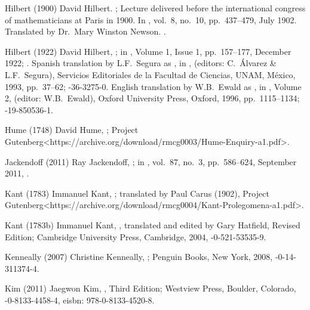 \biblabel Hilbert (1900)
David Hilbert.
;
Lecture delivered before the international
congress of mathematicians at Paris in 1900.
In ,
vol.\ 8, no.\ 10, pp.\ 437--479, July 1902.
Translated by Dr.\ Mary Winston Newson.
.

\biblabel Hilbert (1922)
David Hilbert,
;
in ,
Volume 1, Issue 1, pp.~157--177, December 1922;
.
Spanish translation by L.F.\ Segura as
,
in ,
 (editors: C.\ Álvarez \& L.F.\ Segura),
Servicios Editoriales de la Facultad de Ciencias, UNAM,
México, 1993, pp.~37--62;
-36-3275-0.
English translation by W.B.\ Ewald as
,
in , Volume 2,
 (editor: W.B.\ Ewald),
Oxford University Press, Oxford, 1996, pp.~1115--1134;
-19-850536-1.

\biblabel Hume (1748)
David Hume,
;
\URL Project Gutenberg<https://archive.org/download/rmcg0003/Hume-Enquiry-a1.pdf>.

\biblabel Jackendoff (2011)
Ray Jackendoff,
;
in ,
vol.\ 87, no.\ 3, pp.\ 586--624, September 2011,
.

\biblabel Kant (1783)
Immanuel Kant,
;
translated by Paul Carus (1902),
\URL Project Gutenberg<https://archive.org/download/rmcg0004/Kant-Prolegomena-a1.pdf>.

\biblabel Kant (1783b)
Immanuel Kant,
,
translated and edited by Gary Hatfield, Revised Edition;
Cambridge University Press, Cambridge, 2004,
-0-521-53535-9.

\biblabel Kenneally (2007)
Christine Kenneally,
;
Penguin Books, New York, 2008,
-0-14-311374-4.

\biblabel Kim (2011)
Jaegwon Kim,
, Third Edition;
Westview Press, Boulder, Colorado,
-0-8133-4458-4,
e{\sc isbn}: 978-0-8133-4520-8.

